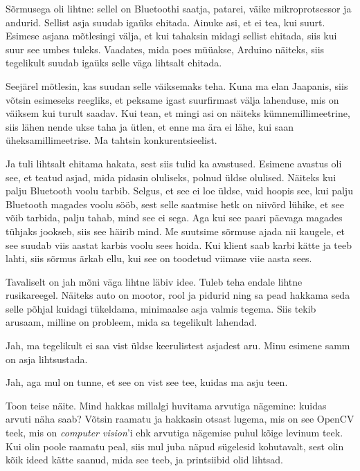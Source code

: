 Sõrmusega oli lihtne: sellel on Bluetoothi saatja, 
patarei, väike mikroprotsessor ja andurid. Sellist asja suudab 
igaüks ehitada. Ainuke asi, et ei tea, kui suurt. Esimese asjana mõtlesingi 
välja, et kui tahaksin midagi sellist ehitada, siis kui suur see umbes 
tuleks. Vaadates, mida poes müüakse, Arduino näiteks, siis tegelikult suudab igaüks 
selle väga lihtsalt ehitada. 

Seejärel mõtlesin, kas suudan selle 
väiksemaks teha. Kuna ma elan Jaapanis, 
siis võtsin esimeseks reegliks, et peksame igast suurfirmast välja lahenduse, mis on väiksem kui 
turult saadav. Kui tean, et mingi asi on näiteks 
kümnemillimeetrine, siis lähen nende ukse taha ja ütlen, et enne ma ära ei 
lähe, kui saan üheksamillimeetrise. Ma tahtsin konkurentsieelist. 

Ja tuli lihtsalt ehitama hakata, sest siis tulid ka avastused. Esimene avastus oli 
see, et teatud asjad, mida pidasin oluliseks, polnud üldse olulised. Näiteks kui
palju Bluetooth voolu tarbib. Selgus, et see ei loe üldse, vaid hoopis 
see, kui palju Bluetooth magades voolu sööb, sest selle saatmise hetk on 
niivõrd lühike, et see võib tarbida, palju tahab, mind see ei sega. Aga kui see
paari päevaga magades tühjaks jookseb, siis see häirib mind. Me suutsime 
sõrmuse ajada nii kaugele, et see suudab viis aastat karbis voolu sees hoida. 
Kui klient saab karbi kätte ja teeb lahti, siis sõrmus ärkab ellu, kui 
see on toodetud viimase viie aasta sees. 


Tavaliselt on jah mõni väga lihtne läbiv idee. Tuleb teha endale lihtne rusikareegel. Näiteks auto 
on mootor, rool ja pidurid ning sa pead hakkama seda selle põhjal kuidagi tükeldama, minimaalse asja valmis tegema. Siis tekib arusaam, milline on 
probleem, mida sa tegelikult lahendad. 


Jah, ma tegelikult ei saa vist üldse 
keerulistest asjadest aru. Minu esimene samm on asja lihtsustada. 


Jah, aga mul on tunne, et see on vist see tee, kuidas ma asju teen. 

Toon teise näite. Mind hakkas millalgi huvitama arvutiga 
nägemine: kuidas arvuti näha saab? Võtsin raamatu ja hakkasin otsast lugema, 
mis on see OpenCV teek, mis on \emph{computer vision}'i ehk arvutiga 
nägemise puhul kõige levinum teek. Kui olin poole raamatu peal, siis
mul juba näpud sügelesid kohutavalt, sest olin kõik 
ideed kätte saanud, mida see teeb, ja printsiibid olid lihtsad. 

